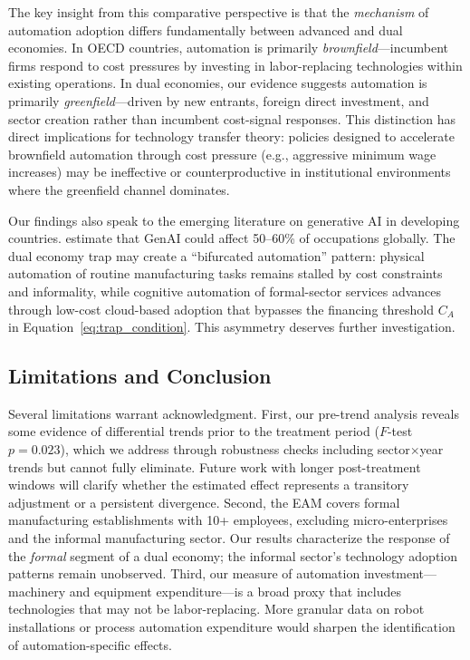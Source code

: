 \documentclass[a4paper,fleqn]{cas-sc}
\begin{document}
The key insight from this comparative perspective is that the \emph{mechanism} of automation adoption differs fundamentally between advanced and dual economies. In OECD countries, automation is primarily \emph{brownfield}---incumbent firms respond to cost pressures by investing in labor-replacing technologies within existing operations. In dual economies, our evidence suggests automation is primarily \emph{greenfield}---driven by new entrants, foreign direct investment, and sector creation rather than incumbent cost-signal responses. This distinction has direct implications for technology transfer theory: policies designed to accelerate brownfield automation through cost pressure (e.g., aggressive minimum wage increases) may be ineffective or counterproductive in institutional environments where the greenfield channel dominates.

Our findings also speak to the emerging literature on generative AI in developing countries. \citet{gmyrek2023generative} estimate that GenAI could affect 50--60\% of occupations globally. The dual economy trap may create a ``bifurcated automation'' pattern: physical automation of routine manufacturing tasks remains stalled by cost constraints and informality, while cognitive automation of formal-sector services advances through low-cost cloud-based adoption that bypasses the financing threshold $C_A$ in Equation~\eqref{eq:trap_condition}. This asymmetry deserves further investigation.

\subsection{Limitations and Conclusion}
\label{subsec:conclusion}

Several limitations warrant acknowledgment. First, our pre-trend analysis reveals some evidence of differential trends prior to the treatment period ($F$-test $p = 0.023$), which we address through robustness checks including sector$\times$year trends but cannot fully eliminate. Future work with longer post-treatment windows will clarify whether the estimated effect represents a transitory adjustment or a persistent divergence. Second, the EAM covers formal manufacturing establishments with 10+ employees, excluding micro-enterprises and the informal manufacturing sector. Our results characterize the response of the \emph{formal} segment of a dual economy; the informal sector's technology adoption patterns remain unobserved. Third, our measure of automation investment---machinery and equipment expenditure---is a broad proxy that includes technologies that may not be labor-replacing. More granular data on robot installations or process automation expenditure would sharpen the identification of automation-specific effects.
\end{document}
